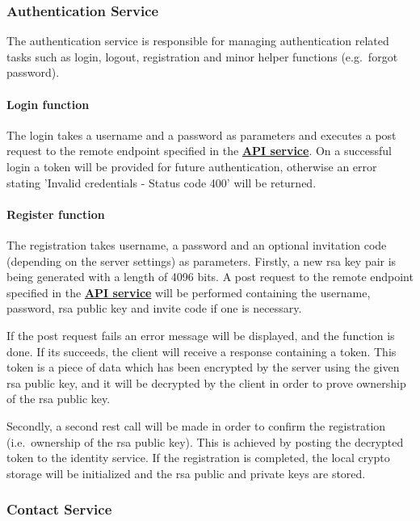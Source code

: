 \subsubsection{Authentication Service}\label{subsubsec:auth-service}

The authentication service is responsible for managing authentication related tasks such as login, logout, registration
and minor helper functions (e.g.\ forgot password).

\paragraph{Login function}
The login takes a username and a password as parameters and executes a post request to the remote endpoint specified in
the \textbf{\hyperref[subsubsec:api-service]{API service}}.
On a successful login a token will be provided for future authentication, otherwise an error stating 'Invalid
credentials - Status code 400' will be returned.

\paragraph{Register function}
The registration takes username, a password and an optional invitation code (depending on the server settings) as
parameters.
Firstly, a new \ac{rsa} key pair is being generated with a length of 4096 bits.
A post request to the remote endpoint specified in the \textbf{\hyperref[subsubsec:api-service]{API service}} will be
performed containing the username, password, \ac{rsa} public key and invite code if one is necessary.

If the post request fails an error message will be displayed, and the function is done.
If its succeeds, the client will receive a response containing a token.
This token is a piece of data which has been encrypted by the server using the given \ac{rsa} public key, and it will
be decrypted by the client in order to prove ownership of the \ac{rsa} public key.

Secondly, a second \ac{rest} call will be made in order to confirm the registration (i.e.\ ownership of the \ac{rsa}
public key).
This is achieved by posting the decrypted token to the identity service.
If the registration is completed, the local crypto storage will be initialized and the \ac{rsa} public and private keys
are stored.

\subsubsection{Contact Service}\label{subsubsec:contact-service}

